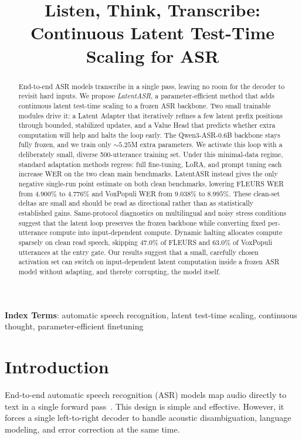 \documentclass[a4paper]{article}
\title{Listen, Think, Transcribe: Continuous Latent Test-Time Scaling for ASR}
\newcommand{\method}{LatentASR}
\begin{document}
\maketitle

\begin{abstract}
End-to-end ASR models transcribe in a single pass, leaving no room for the decoder to revisit hard inputs. We propose \emph{LatentASR}, a parameter-efficient method that adds continuous latent test-time scaling to a frozen ASR backbone. Two small trainable modules drive it: a Latent Adapter that iteratively refines a few latent prefix positions through bounded, stabilized updates, and a Value Head that predicts whether extra computation will help and halts the loop early. The Qwen3-ASR-0.6B backbone stays fully frozen, and we train only ${\sim}5.25$M extra parameters. We activate this loop with a deliberately small, diverse 500-utterance training set. Under this minimal-data regime, standard adaptation methods regress: full fine-tuning, LoRA, and prompt tuning each increase WER on the two clean main benchmarks. \method{} instead gives the only negative single-run point estimate on both clean benchmarks, lowering FLEURS WER from $4.900\%$ to $4.776\%$ and VoxPopuli WER from $9.038\%$ to $8.995\%$. These clean-set deltas are small and should be read as directional rather than as statistically established gains. Same-protocol diagnostics on multilingual and noisy stress conditions suggest that the latent loop preserves the frozen backbone while converting fixed per-utterance compute into input-dependent compute. Dynamic halting allocates compute sparsely on clean read speech, skipping $47.0\%$ of FLEURS and $63.0\%$ of VoxPopuli utterances at the entry gate. Our results suggest that a small, carefully chosen activation set can switch on input-dependent latent computation inside a frozen ASR model without adapting, and thereby corrupting, the model itself.
\end{abstract}
\noindent\textbf{Index Terms}: automatic speech recognition, latent test-time scaling, continuous thought, parameter-efficient finetuning

\section{Introduction}

End-to-end automatic speech recognition (ASR) models map audio directly to text in a single forward pass~\cite{radford2023robust,peng2025owsm}. This design is simple and effective. However, it forces a single left-to-right decoder to handle acoustic disambiguation, language modeling, and error correction at the same time.
\end{document}

